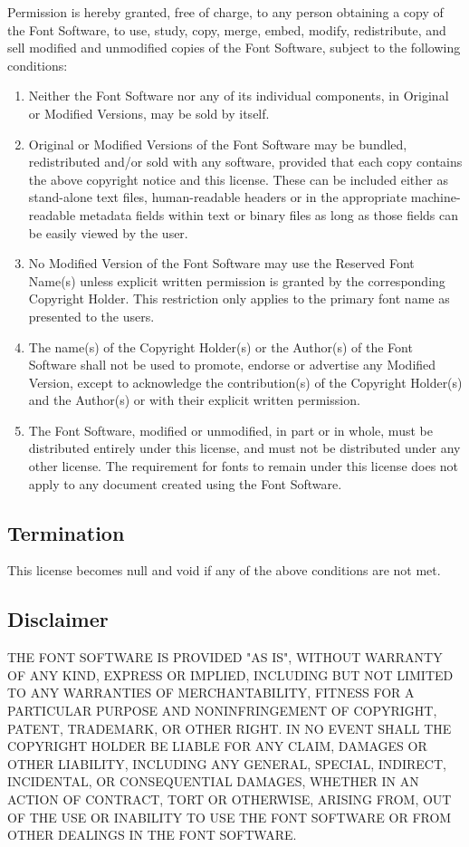 \documentclass[paper=a4, 12pt]{scrbook}
\begin{document}
Permission is hereby granted, free of charge, to any person obtaining a copy of the Font Software, to use, study, copy, merge, embed, modify, redistribute, and sell modified and unmodified copies of the Font Software, subject to the following conditions:

\begin{enumerate}
	\item Neither the Font Software nor any of its individual components, in Original or Modified Versions, may be sold by itself.
	\item Original or Modified Versions of the Font Software may be bundled, redistributed and/or sold with any software, provided that each copy contains the above copyright notice and this license. These can be included either as stand-alone text files, human-readable headers or in the appropriate machine-readable metadata fields within text or binary files as long as those fields can be easily viewed by the user.
	\item No Modified Version of the Font Software may use the Reserved Font Name(s) unless explicit written permission is granted by the corresponding Copyright Holder. This restriction only applies to the primary font name as presented to the users.

	\item The name(s) of the Copyright Holder(s) or the Author(s) of the Font Software shall not be used to promote, endorse or advertise any Modified Version, except to acknowledge the contribution(s) of the Copyright Holder(s) and the Author(s) or with their explicit written permission.

	\item The Font Software, modified or unmodified, in part or in whole, must be distributed entirely under this license, and must not be
distributed under any other license. The requirement for fonts to remain under this license does not apply to any document created using the Font Software.

\end{enumerate}

\subsection{Termination}

This license becomes null and void if any of the above conditions are not met.

\subsection{Disclaimer}

 THE FONT SOFTWARE IS PROVIDED "AS IS", WITHOUT WARRANTY OF ANY KIND, EXPRESS OR IMPLIED, INCLUDING BUT NOT LIMITED TO ANY WARRANTIES OF MERCHANTABILITY, FITNESS FOR A PARTICULAR PURPOSE AND NONINFRINGEMENT OF COPYRIGHT, PATENT, TRADEMARK, OR OTHER RIGHT. IN NO EVENT SHALL THE COPYRIGHT HOLDER BE LIABLE FOR ANY CLAIM, DAMAGES OR OTHER LIABILITY, INCLUDING ANY GENERAL, SPECIAL, INDIRECT, INCIDENTAL, OR CONSEQUENTIAL DAMAGES, WHETHER IN AN ACTION OF CONTRACT, TORT OR OTHERWISE, ARISING FROM, OUT OF THE USE OR INABILITY TO USE THE FONT SOFTWARE OR FROM OTHER DEALINGS IN THE FONT SOFTWARE.
\end{document}
